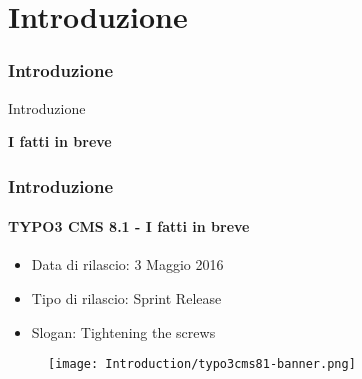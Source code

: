 %

\section{Introduzione}
\begin{frame}[fragile]
	\frametitle{Introduzione}

	\begin{center}\huge{Introduzione}\end{center}
	\begin{center}\huge{\color{typo3darkgrey}\textbf{I fatti in breve}}\end{center}

\end{frame}

\begin{frame}[fragile]
	\frametitle{Introduzione}
	\framesubtitle{TYPO3 CMS 8.1 - I fatti in breve}

	\begin{itemize}
		\item Data di rilascio: 3 Maggio 2016
		\item Tipo di rilascio: Sprint Release
		\item Slogan: Tightening the screws
	\end{itemize}

	\begin{figure}
		\texttt{[image: Introduction/typo3cms81-banner.png]}
	\end{figure}

\end{frame}

